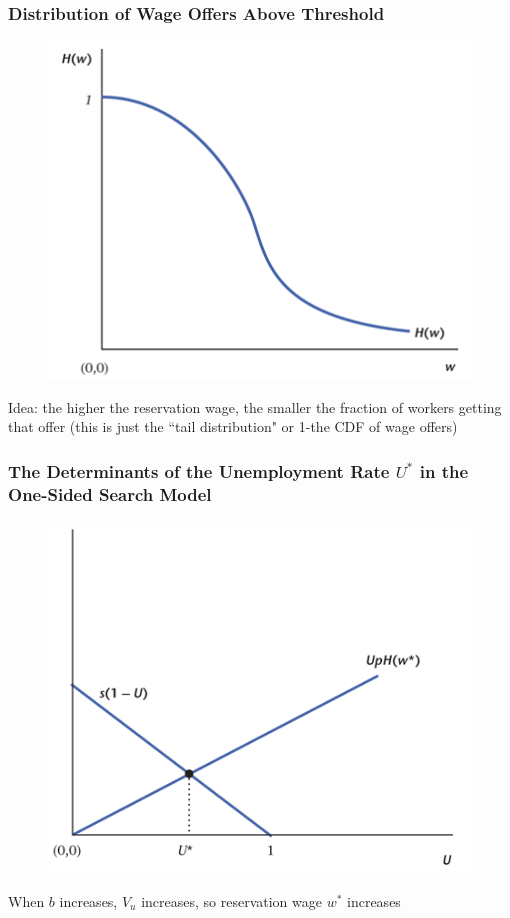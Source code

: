 \documentclass{beamer}
\begin{document}
\begin{frame}
\frametitle[alignment=center]{Distribution of Wage Offers Above Threshold}
\begin{figure}
\centering
\includegraphics[scale=0.5]{Figures/W_Fig_6pt12.png}
\end{figure}
Idea:  the higher the reservation wage, the smaller the fraction of workers getting that offer (this is just the ``tail distribution" or 1-the CDF of wage offers)
\end{frame}

\begin{frame}
\frametitle[alignment=center]{The Determinants of the Unemployment Rate $U^*$ in the One-Sided Search Model}
\begin{figure}
\centering
\includegraphics[scale=0.5]{Figures/W_Fig_6pt13.png}
\end{figure}
When $b$ increases, $V_u$ increases, so reservation wage $w^*$ increases
\end{frame}
\end{document}
